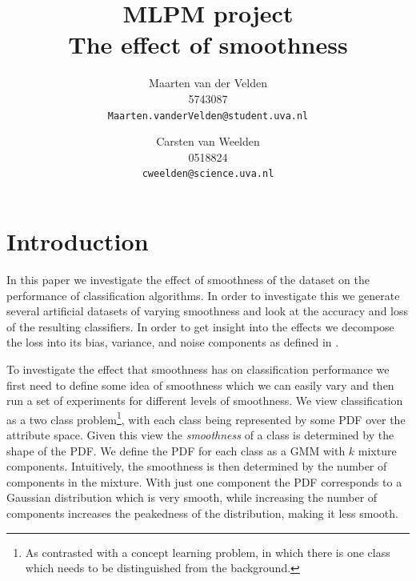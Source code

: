 \documentclass[a4paper]{article}
\begin{document}
\title{MLPM project \\ The effect of smoothness}
\author{Maarten van der Velden \\ 5743087 \\ \texttt{Maarten.vanderVelden@student.uva.nl} \and Carsten van Weelden \\ 0518824 \\ \texttt{cweelden@science.uva.nl}}
\maketitle


\acresetall

\section{Introduction}
\label{sec:introduction}

In this paper we investigate the effect of smoothness of the dataset on the performance of classification algorithms. In order to investigate this we generate several artificial datasets of varying smoothness and look at the accuracy and loss of the resulting classifiers. In order to get insight into the effects we decompose the loss into its bias, variance, and noise components as defined in \cite{Domingos2000}.


To investigate the effect that smoothness has on classification performance we first need to define some idea of smoothness which we can easily vary and then run a set of experiments for different levels of smoothness. We view classification as a two class problem\footnote{As contrasted with a concept learning problem, in which there is one class which needs to be distinguished from the background.}, with each class being represented by some \ac{PDF} over the attribute space. Given this view the \emph{smoothness} of a class is determined by the shape of the \ac{PDF}. We define the \ac{PDF} for each class as a \ac{GMM} with $k$ mixture components. Intuitively, the smoothness is then determined by the number of components in the mixture. With just one component the \ac{PDF} corresponds to a Gaussian distribution which is very smooth, while increasing the number of components increases the peakedness of the distribution, making it less smooth.
\end{document}
